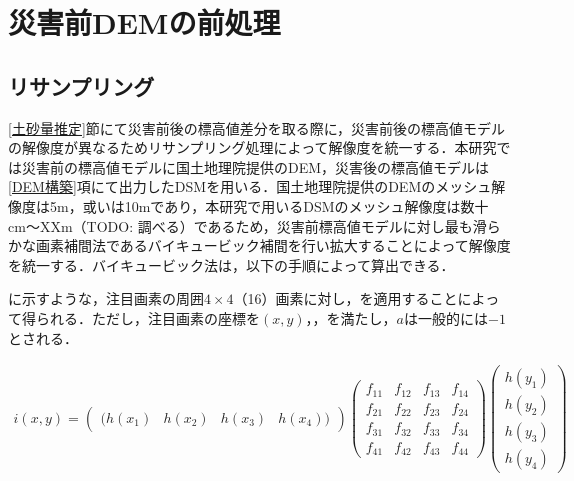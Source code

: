   \section{災害前DEMの前処理}
    \subsection{リサンプリング}
      \ref{土砂量推定}節にて災害前後の標高値差分を取る際に，災害前後の標高値モデルの解像度が異なるためリサンプリング処理によって解像度を統一する．本研究では災害前の標高値モデルに国土地理院提供のDEM，災害後の標高値モデルは\ref{DEM構築}項にて出力したDSMを用いる．国土地理院提供のDEMのメッシュ解像度は5m，或いは10mであり，本研究で用いるDSMのメッシュ解像度は数十cm〜XXm（TODO: 調べる）であるため，災害前標高値モデルに対し最も滑らかな画素補間法であるバイキュービック補間\cite{論文手法1}を行い拡大することによって解像度を統一する．バイキュービック法は，以下の手順によって算出できる．
      
      \fref{}に示すような，注目画素の周囲$4\times4$（16）画素に対し，を適用することによって得られる．ただし，注目画素の座標を$(x,y)$，，を満たし，$a$は一般的には$-1$とされる．

      \begin{eqnarray}
        \label{バイキュービック法1}
          i(x,y) = 
          \begin{pmatrix}
          (h(x_{1}) & h(x_{2}) & h(x_{3}) & h(x_{4}))
          \end{pmatrix}
          \begin{pmatrix}
            f_{11} & f_{12} & f_{13} & f_{14} \\
            f_{21} & f_{22} & f_{23} & f_{24} \\
            f_{31} & f_{32} & f_{33} & f_{34} \\
            f_{41} & f_{42} & f_{43} & f_{44}
          \end{pmatrix}
          \begin{pmatrix}
            h(y_{1}) \\ h(y_{2}) \\ h(y_{3}) \\ h(y_{4})
          \end{pmatrix}
        \end{eqnarray}
  
